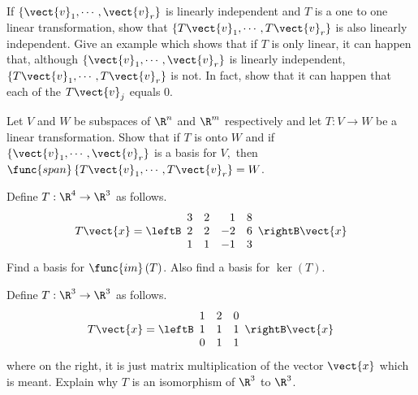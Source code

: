 \begin{enumialphparenastyle}
\begin{ex}
\begin{sol}
\end{sol}
\end{ex}


\begin{ex} If $\left\{ \vect{v}_{1},\cdots ,\vect{v}_{r}\right\} $ is linearly
independent and $T$ is a one to one linear transformation, show that $
\left\{ T\vect{v}_{1},\cdots ,T\vect{v}_{r}\right\} $ is also linearly
independent. Give an example which shows that if $T$ is only linear, it can
happen that, although $\left\{ \vect{v}_{1},\cdots ,\vect{v}_{r}\right\} $ is
linearly independent, $\left\{ T\vect{v}_{1},\cdots ,T\vect{v}_{r}\right\} $
is not. In fact, show that it can happen that each of the $T\vect{v}_{j}$
equals 0.
\end{ex}


\begin{ex} Let $V$ and $W$ be subspaces of $\R^{n}$ and $\R^{m}$
respectively and let $T:V\rightarrow W$ be a linear transformation. Show
that if $T$ is onto $W$ and if $\left\{ \vect{v}_{1},\cdots ,\vect{v}
_{r}\right\} $ is a basis for $V,$ then $\func{span}\left\{ T\vect{v}
_{1},\cdots ,T\vect{v}_{r}\right\} =W$.
\end{ex}


\begin{ex} Define $T:\R^{4}\rightarrow \R^{3}$ as follows. 
\begin{equation*}
T\vect{x}=\leftB 
\begin{array}{rrrr}
3 & 2 & 1 & 8 \\ 
2 & 2 & -2 & 6 \\ 
1 & 1 & -1 & 3
\end{array}
\rightB \vect{x}
\end{equation*}
Find a basis for $\func{im}\left( T\right) $. Also find a basis for $\ker
\left( T\right) .$
\end{ex}


\begin{ex} Define $T:\R^{3}\rightarrow \R^{3}$ as follows. 
\begin{equation*}
T\vect{x}=\leftB 
\begin{array}{ccc}
1 & 2 & 0 \\ 
1 & 1 & 1 \\ 
0 & 1 & 1
\end{array}
\rightB \vect{x}
\end{equation*}
where on the right, it is just matrix multiplication of the vector $\vect{x}$
which is meant. Explain why $T$ is an isomorphism of $\R^{3}$ to $
\R^{3}$.
\end{ex}



\end{enumialphparenastyle}
